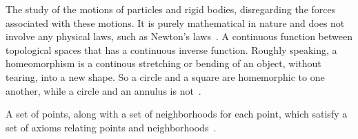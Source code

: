 {
    The study of the motions of particles and rigid bodies, disregarding the forces associated with these motions.
    It is purely mathematical in nature and does not involve any physical laws, such as Newton's laws~\cite{greenwood1988}.
}
{
   A continuous function between topological spaces that has a continuous inverse function.
   Roughly speaking, a homeomorphism is a continous stretching or bending of an object, without tearing, into a new shape. 
   So a circle and a square are homemorphic to one another, while a circle and an annulus is not~\cite{morris1989}.
}

{
    A set of points, along with a set of neighborhoods for each point, which satisfy a set of axioms relating points and neighborhoods~\cite{morris1989}.
}
